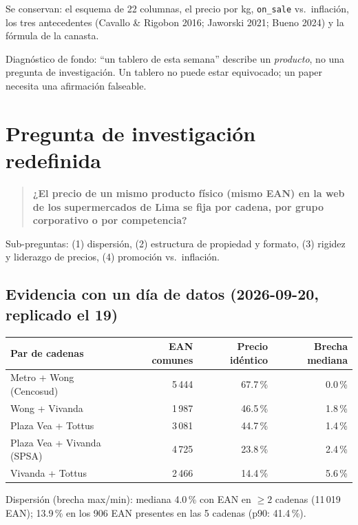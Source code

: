 \documentclass[11pt,a4paper]{article}
\begin{document}
Se conservan: el esquema de 22 columnas, el precio por kg, \texttt{on\_sale} vs.\
inflación, los tres antecedentes (Cavallo \& Rigobon 2016; Jaworski 2021; Bueno
2024) y la fórmula de la canasta.

Diagnóstico de fondo: ``un tablero de esta semana'' describe un \emph{producto},
no una pregunta de investigación. Un tablero no puede estar equivocado; un paper
necesita una afirmación falseable.

\section{Pregunta de investigación redefinida}

\begin{quote}
\textbf{¿El precio de un mismo producto físico (mismo EAN) en la web de los
supermercados de Lima se fija por cadena, por grupo corporativo o por
competencia?}
\end{quote}

Sub-preguntas: (1) dispersión, (2) estructura de propiedad y formato,
(3) rigidez y liderazgo de precios, (4) promoción vs.\ inflación.

\subsection*{Evidencia con un día de datos (2026-09-20, replicado el 19)}

\begin{table}[h]
\centering
\begin{tabular}{lrrr}
\toprule
\textbf{Par de cadenas} & \textbf{EAN comunes} & \textbf{Precio idéntico} & \textbf{Brecha mediana} \\
\midrule
Metro + Wong (Cencosud)       & 5\,444 & 67.7\,\% & 0.0\,\% \\
Wong + Vivanda                & 1\,987 & 46.5\,\% & 1.8\,\% \\
Plaza Vea + Tottus            & 3\,081 & 44.7\,\% & 1.4\,\% \\
Plaza Vea + Vivanda (SPSA)    & 4\,725 & 23.8\,\% & 2.4\,\% \\
Vivanda + Tottus              & 2\,466 & 14.4\,\% & 5.6\,\% \\
\bottomrule
\end{tabular}
\end{table}

Dispersión (brecha max/min): mediana 4.0\,\% con EAN en $\geq 2$ cadenas
(11\,019 EAN); 13.9\,\% en los 906 EAN presentes en las 5 cadenas (p90: 41.4\,\%).
\end{document}
